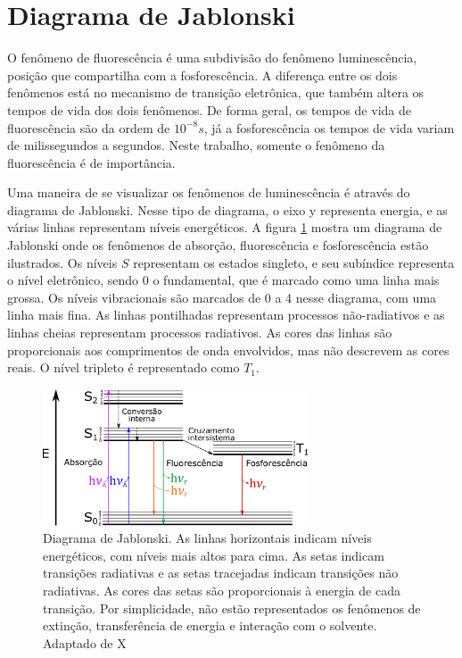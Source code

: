 		\section{Diagrama de Jablonski}
		
		O fenômeno de fluorescência é uma subdivisão do fenômeno luminescência, posição que compartilha com a fosforescência. A diferença entre os dois fenômenos está no mecanismo de transição eletrônica, que também altera os tempos de vida dos dois fenômenos. De forma geral, os tempos de vida de fluorescência são da ordem de \(10^{-8} s\), já a fosforescência os tempos de vida variam de milissegundos a segundos. Neste trabalho, somente o fenômeno da fluorescência é de importância.
		
		Uma maneira de se visualizar os fenômenos de luminescência é através do diagrama de Jablonski. Nesse tipo de diagrama, o eixo y representa energia, e as várias linhas representam níveis energéticos. A figura \ref{fig:diagrama_jablonski} mostra um diagrama de Jablonski onde os fenômenos de absorção, fluorescência e fosforescência estão ilustrados. Os níveis \(S\) representam os estados singleto, e seu subíndice representa o nível eletrônico, sendo 0 o fundamental, que é marcado como uma linha mais grossa. Os níveis vibracionais são marcados de 0 a 4 nesse diagrama, com uma linha mais fina. As linhas pontilhadas representam processos não-radiativos e as linhas cheias representam processos radiativos. As cores das linhas são proporcionais aos comprimentos de onda envolvidos, mas não descrevem as cores reais. O nível tripleto é representado como \(T_1\).  %
		
		\begin{figure}[h]
			\centering
			\includegraphics[width=0.7\textwidth]{imagens/fluor/diagrama_jablonski}
			\caption[Diagrama de Jablonski]{Diagrama de Jablonski. As linhas horizontais indicam níveis energéticos, com níveis mais altos para cima. As setas indicam transições radiativas e as setas tracejadas indicam transições não radiativas. As cores das setas são proporcionais à energia de cada transição. Por simplicidade, não estão representados os fenômenos de extinção, transferência de energia e interação com o solvente. Adaptado de X}
			\label{fig:diagrama_jablonski}  %
		\end{figure}  
		

